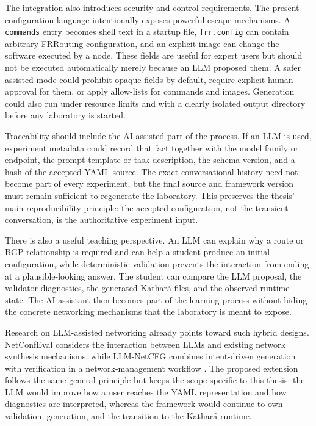 The integration also introduces security and control requirements. The present
configuration language intentionally exposes powerful escape mechanisms. A
\texttt{commands} entry becomes shell text in a startup file,
\texttt{frr.config} can contain arbitrary FRRouting configuration, and an
explicit image can change the software executed by a node. These fields are
useful for expert users but should not be executed automatically merely because
an LLM proposed them. A safer assisted mode could prohibit opaque fields by
default, require explicit human approval for them, or apply allow-lists for
commands and images. Generation could also run under resource limits and with a
clearly isolated output directory before any laboratory is started.

Traceability should include the AI-assisted part of the process. If an LLM is
used, experiment metadata could record that fact together with the model family
or endpoint, the prompt template or task description, the schema version, and a
hash of the accepted YAML source. The exact conversational history need not
become part of every experiment, but the final source and framework version
must remain sufficient to regenerate the laboratory. This preserves the thesis'
main reproducibility principle: the accepted configuration, not the transient
conversation, is the authoritative experiment input.

There is also a useful teaching perspective. An LLM can explain why a route or
BGP relationship is required and can help a student produce an initial
configuration, while deterministic validation prevents the interaction from
ending at a plausible-looking answer. The student can compare the LLM proposal,
the validator diagnostics, the generated Kathar\'a files, and the observed
runtime state. The AI assistant then becomes part of the learning process
without hiding the concrete networking mechanisms that the laboratory is meant
to expose.

Research on LLM-assisted networking already points toward such hybrid designs.
NetConfEval considers the interaction between LLMs and existing network
synthesis mechanisms, while LLM-NetCFG combines intent-driven generation with
verification in a network-management workflow
\cite{wang2024netconfeval,lira2025llmnetcfg}. The proposed extension follows
the same general principle but keeps the scope specific to this thesis: the LLM
would improve how a user reaches the YAML representation and how diagnostics are
interpreted, whereas the framework would continue to own validation, generation,
and the transition to the Kathar\'a runtime.

